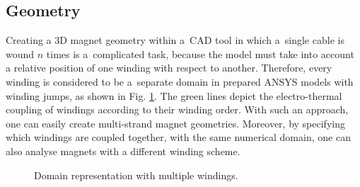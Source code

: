 \subsection{Geometry}
\label{subsection:algorithms_geometry}

Creating a 3D magnet geometry within a~CAD tool in which a~single cable is wound $n$ times is a~complicated task, because the model must take into account a relative position of one winding with respect to another. Therefore, every winding is considered to be a~separate domain in prepared ANSYS models with winding jumps, as shown in Fig. \ref{fig:winding_geom_scheme}. The green lines depict the electro-thermal coupling of windings according to their winding order. With such an approach, one can easily create multi-strand magnet geometries. Moreover, by specifying which windings are coupled together, with the same numerical domain, one can also analyse magnets with a different winding scheme.

\begin{figure}[H]
\centering
{}
\caption{Domain representation with multiple windings.}
\label{fig:winding_geom_scheme}
\end{figure}

